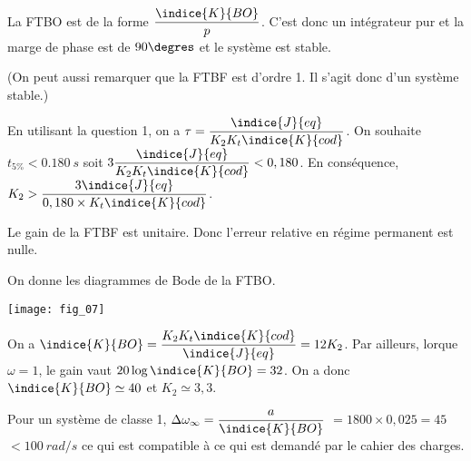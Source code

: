 \ifprof
\begin{corrige}
La FTBO est de la forme $\dfrac{\indice{K}{BO}}{p}$. C'est donc un intégrateur pur et la marge de phase est de $90\degres$ et le système est stable.

(On peut aussi remarquer que la FTBF est d'ordre 1. Il s'agit donc d'un système stable.)
\end{corrige}
\else
\fi


\ifprof
\begin{corrige}
En utilisant la question 1, on a $\tau = \dfrac{\indice{J}{eq}}{K_2K_t \indice{K}{cod}}$. On souhaite $t_{5\%} <  \SI{0,180}{s}$ soit $3 \dfrac{\indice{J}{eq}}{K_2K_t \indice{K}{cod}} < 0,180$. 
En conséquence, $K_2  > 	\dfrac{3 \indice{J}{eq}}{0,180 \times K_t \indice{K}{cod}}$.
\end{corrige}
\else
\fi


\ifprof
\begin{corrige}
Le gain de la FTBF est unitaire. Donc l’erreur relative en régime permanent est nulle.

\end{corrige}
\else
\fi

On donne les diagrammes de Bode de la FTBO.

\begin{center}
\texttt{[image: fig\_07]}
\end{center}


\ifprof
\begin{corrige}
On a $\indice{K}{BO} = \dfrac{K_2 K_t \indice{K}{cod}}{\indice{J}{eq}} = 12 K_2$.
Par ailleurs, lorque $\omega=1$, le gain vaut $20\log \indice{K}{BO}= 32$. 
On a donc $\indice{K}{BO} \simeq 40$ et $K_2 \simeq 3,3$.
\end{corrige}
\else
\fi

\ifprof
\begin{corrige}
Pour un système de classe 1, $\Delta \omega_{\infty} = \dfrac{a}{\indice{K}{BO}}$ $=1800\times0,025 = 45$ $<\SI{100}{rad/s}$ ce qui est compatible à ce qui est demandé par le cahier des charges.  
\end{corrige}
\else
\fi

